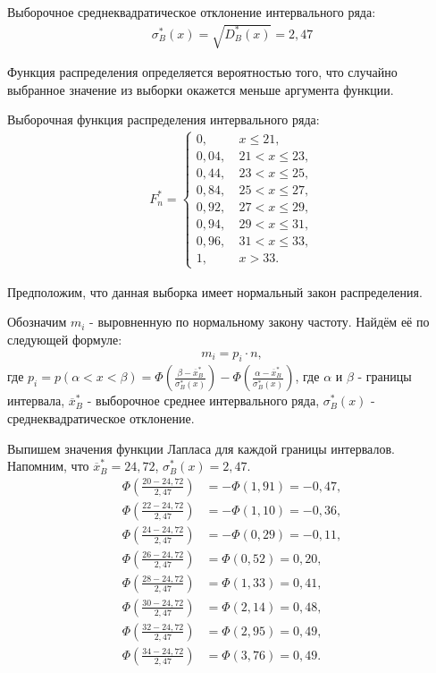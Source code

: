 \documentclass[utf8, a4paper, 14pt, russian, oneside]{book}
\begin{document}
Выборочное среднеквадратическое отклонение интервального ряда:
\begin{align*}
    \sigma_B^*(x) = \sqrt{D_B^*(x)} = 2,47
\end{align*}

Функция распределения определяется вероятностью того, что случайно выбранное значение из выборки окажется меньше аргумента функции.

Выборочная функция распределения интервального ряда:
\begin{align*}
    F_n^* =
    \begin{cases}
        0   ,&\ x \leq 21, \\
        0,04,&\  21 < x \leq 23, \\
        0,44,&\  23 < x \leq 25, \\
        0,84,&\  25 < x \leq 27, \\
        0,92,&\  27 < x \leq 29, \\
        0,94,&\  29 < x \leq 31, \\
        0,96,&\  31 < x \leq 33, \\
        1   ,&\  x > 33.
    \end{cases}
\end{align*}
\newpage

Предположим, что данная выборка имеет нормальный закон распределения.

Обозначим $m_i$ - выровненную по нормальному закону частоту. Найдём её по следующей формуле:
\begin{align*}
    m_i = p_i \cdot n,
\end{align*}
где $p_i = p(\alpha < x < \beta) = \Phi(\tfrac{\beta - \overline{x}_B^*}{\sigma_B^*(x)}) - \Phi(\tfrac{\alpha - \overline{x}_B^*}{\sigma_B^*(x)})$, где
$\alpha$ и $\beta$ - границы интервала, $\overline{x}_B^*$ - выборочное среднее интервального ряда, $\sigma_B^*(x)$ - среднеквадратическое отклонение.


Выпишем значения функции Лапласа для каждой границы интервалов. Напомним, что $\overline{x}_B^* = 24,72$, $\sigma_B^*(x) = 2,47$.
\begin{align*}
    \Phi \left( \frac{20 - 24,72}{2,47} \right) &= -\Phi(1,91) = -0,47,\\
    \Phi \left( \frac{22 - 24,72}{2,47} \right) &= -\Phi(1,10) = -0,36,\\
    \Phi \left( \frac{24 - 24,72}{2,47} \right) &= -\Phi(0,29) = -0,11,\\
    \Phi \left( \frac{26 - 24,72}{2,47} \right) &=  \Phi(0,52) =  0,20,\\
    \Phi \left( \frac{28 - 24,72}{2,47} \right) &=  \Phi(1,33) =  0,41,\\
    \Phi \left( \frac{30 - 24,72}{2,47} \right) &=  \Phi(2,14) =  0,48,\\
    \Phi \left( \frac{32 - 24,72}{2,47} \right) &=  \Phi(2,95) =  0,49,\\
    \Phi \left( \frac{34 - 24,72}{2,47} \right) &=  \Phi(3,76) =  0,49.
\end{align*}
\end{document}
